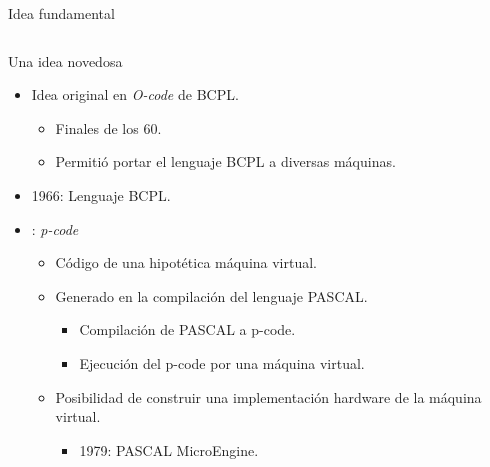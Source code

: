 \begin{frame}[t]{Idea fundamental}
\begin{columns}
\begin{column}{0.1\textwidth}
  \end{column}
\end{columns}
\end{frame}

\begin{frame}[t]{Una idea novedosa}
  \begin{itemize}
    \item Idea original en \emph{O-code} de BCPL.
      \begin{itemize}
        \item Finales de los 60.
        \item Permitió portar el lenguaje BCPL a diversas máquinas.
      \end{itemize}
    \item 1966: Lenguaje BCPL.
    \item {}: \emph{p-code}
      \begin{itemize}
         \item Código de una hipotética máquina virtual.
         \item Generado en la compilación del lenguaje PASCAL.
           \begin{itemize}
             \item Compilación de PASCAL a p-code.
             \item Ejecución del p-code por una máquina virtual.
           \end{itemize}
         \item Posibilidad de construir una implementación hardware de la máquina virtual.
           \begin{itemize}
             \item 1979: PASCAL MicroEngine.
           \end{itemize}
      \end{itemize}
  \end{itemize}
\end{frame}

